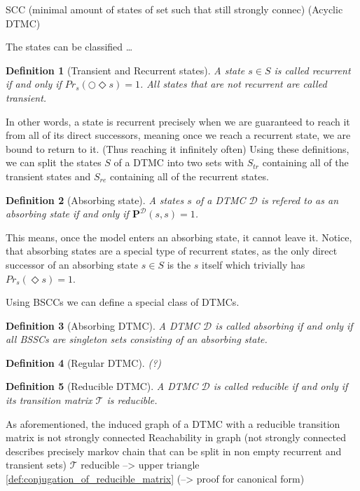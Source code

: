 \documentclass[journal,compsoc,10pt]{IEEEtran}
\newcommand{\MC}{\mathcal{D}} %
\newcommand{\tT}{\mathcal{T}} %
\newcommand{\PF}{\mathbf{P}} %
\newcommand{\cCircle}{\bigcirc} %
\newcommand{\tod}{\todo[color=red!40]} %
\newtheorem{definition}{Definition}[section]
\begin{document}
SCC (minimal amount of states of set such that still strongly connec)
(Acyclic DTMC)

The states can be classified \dots
\begin{definition}[Transient and Recurrent states]\label{def:transient_and_recurrent_states}
    A state $s \in S$ is called recurrent if and only if $Pr_s(\cCircle \Diamond s)=1$.\tod{explain: meaning of notation $Pr_s$} All states that are not recurrent are called transient.
\end{definition}
In other words, a state is recurrent precisely when we are guaranteed to reach it from all of its direct successors, meaning once we reach a recurrent state, we are bound to return to it. (Thus reaching it infinitely often) Using these definitions, we can split the states $S$ of a DTMC into two sets with $S_{tr}$ containing all of the transient states and $S_{re}$ containing all of the recurrent states.

\begin{definition}[Absorbing state]
    A states $s$ of a DTMC $\MC$ is refered to as an absorbing state if and only if $\PF^{\MC}(s,s) = 1$.
\end{definition}
This means, once the model enters an absorbing state, it cannot leave it. Notice, that absorbing states are a special type of recurrent states, as the only direct successor of an absorbing state $s\in S$ is the $s$ itself which trivially has $Pr_s(\Diamond s)=1$.

Using BSCCs we can define a special class of DTMCs.
\begin{definition}[Absorbing DTMC]
    A DTMC $\MC$ is called absorbing if and only if all BSSCs are singleton sets consisting of an absorbing state.    
\end{definition}

\begin{definition}[Regular DTMC]
    (?)
\end{definition}

\begin{definition}[Reducible DTMC]
    A DTMC $\MC$ is called reducible if and only if its transition matrix $\tT$ is reducible.
\end{definition}
As aforementioned, the induced graph of a DTMC with a reducible transition matrix is not strongly connected
Reachability in graph (not strongly connected describes precisely markov chain that can be split in non empty recurrent and transient sets)
$\tT$ reducible --> upper triangle \cref{def:conjugation_of_reducible_matrix} (--> proof for canonical form)
\end{document}
